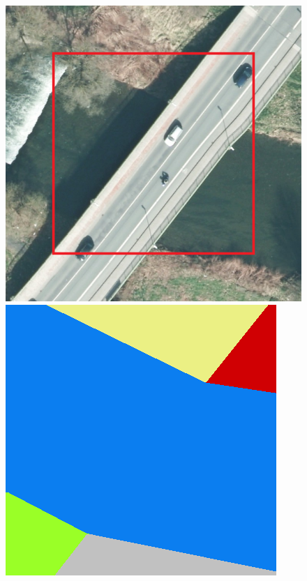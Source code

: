 \begin{figure}
    \vspace{3mm}
    \includegraphics[width=\UnetPredictionsImageWidth]{images/unet/104483-image} \hfill
    \includegraphics[width=\UnetPredictionsImageWidth]{images/unet/104483-label} \hfill

\end{figure}
